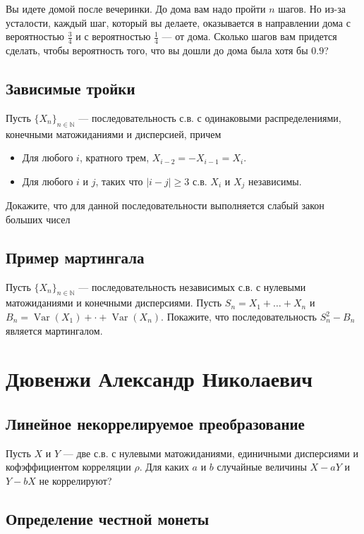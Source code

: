 \documentclass[12pt]{article}
\newcommand\N{\mathbb{N}}
\DeclareMathOperator{\Var}{Var}
\begin{document}
Вы идете домой после вечеринки. До дома вам надо пройти $n$ шагов. Но из-за усталости, каждый шаг, который вы делаете, оказывается в направлении дома с вероятностью $\frac{3}{4}$ и с вероятностью $\frac{1}{4}$ --- от дома. Сколько шагов вам придется сделать, чтобы вероятность того, что вы дошли до дома была хотя бы $0.9$?

\subsection{Зависимые тройки}
Пусть $\{X_n\}_{n \in \N}$ --- последовательность с.в. с одинаковыми распределениями, конечными матожиданиями и дисперсией, причем
\begin{itemize}
    \item Для любого $i$, кратного трем, $X_{i - 2} = - X_{i - 1} = X_{i}$. 
    \item Для любого $i$ и $j$, таких что $|i - j| \ge 3$ с.в. $X_i$ и $X_j$ независимы.
\end{itemize}
Докажите, что для данной последовательности выполняется слабый закон больших чисел


\subsection{Пример мартингала}

Пусть $\{X_n\}_{n \in \N}$ --- последовательность независимых с.в. с нулевыми матожиданиями и конечными дисперсиями. Пусть $S_n = X_1 + \dots + X_n$ и $B_n = \Var(X_1) + \cdot + \Var(X_n)$. Покажите, что последовательность $S_n^2 - B_n$ является мартингалом.


\newpage
\section{Дювенжи Александр Николаевич}

\subsection{Линейное некоррелируемое преобразование}

Пусть $X$ и $Y$ --- две с.в. с нулевыми матожиданиями, единичными дисперсиями и кофэффициентом корреляции $\rho$. Для каких $a$ и $b$ случайные величины $X - aY$ и $Y - bX$ не коррелируют?


\subsection{Определение честной монеты}
\end{document}
